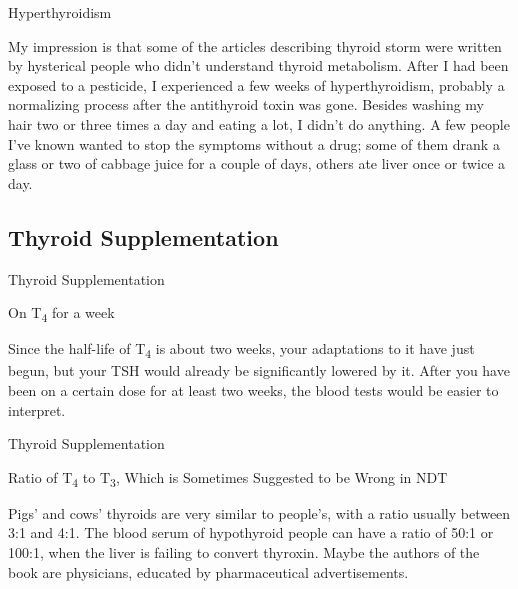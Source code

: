 \documentclass[11pt,oneside,openany,extrafontsizes]{memoir}
\begin{document}
\begin{standalonequote}{Hyperthyroidism}

    \begin{answer}
      My impression is that some of the articles describing thyroid storm were written by hysterical people who didn't understand thyroid metabolism. After I had been exposed to a pesticide, I experienced a few weeks of hyperthyroidism, probably a normalizing process after the antithyroid toxin was gone. Besides washing my hair two or three times a day and eating a lot, I didn't do anything. A few people I've known wanted to stop the symptoms without a drug; some of them drank a glass or two of cabbage juice for a couple of days, others ate liver once or twice a day.
    \end{answer}
\end{standalonequote}

\subsection{Thyroid Supplementation}

\begin{standalonequote}{Thyroid Supplementation}
    \begin{note}
        On T\textsubscript{4} for a week
    \end{note}

    \begin{answer}
        Since the half-life of T\textsubscript{4} is about two weeks, your adaptations to it have just begun, but your TSH would already be significantly lowered by it. After you have been on a certain dose for at least two weeks, the blood tests would be easier to interpret.
    \end{answer}
\end{standalonequote}

\begin{standalonequote}{Thyroid Supplementation}
    \begin{note}
        Ratio of T\textsubscript{4} to T\textsubscript{3}, Which is Sometimes Suggested to be Wrong in NDT
    \end{note}

    \begin{answer}
        Pigs' and cows' thyroids are very similar to people's, with a ratio usually between 3:1 and 4:1. The blood serum of hypothyroid people can have a ratio of 50:1 or 100:1, when the liver is failing to convert thyroxin. Maybe the authors of the book are physicians, educated by pharmaceutical advertisements.
    \end{answer}
\end{standalonequote}
\end{document}
